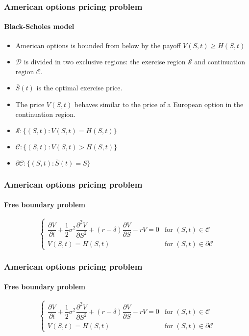\documentclass{beamer}
\begin{document}
\begin{frame}
    \frametitle{American options pricing problem}
    \framesubtitle{Black-Scholes model}
    \begin{itemize}
        \item American options is bounded from below by the payoff $V(S, t) \ge H(S, t)$
        \item $\mathcal{D}$ is divided in two exclusive regions: the exercise region $\mathcal{S}$ and continuation region $\mathcal{C}$. 
        \item $\bar{S}(t)$ is the optimal exercise price.
        \item The price $V(S, t)$ behaves similar to the price of a European option in the continuation region.
        \item $\mathcal{S}: \{(S,t): V(S, t) = H(S, t)\}$
        \item $\mathcal{C}: \{(S,t): V(S, t) > H(S, t)\}$
        \item $\partial{\mathcal{C}}: \{(S,t): \bar{S}(t) = S\}$
    \end{itemize}
\end{frame}

\begin{frame}
    \frametitle{American options pricing problem}
    \framesubtitle{Free boundary problem}

    \begin{equation}
        \begin{cases}
            \dfrac{\partial{V}}{\partial{t}} + \dfrac{1}{2}\sigma^2\dfrac{\partial^2{V}}{\partial{S^2}} + (r-\delta)\dfrac{\partial{V}}{\partial{S}} - rV = 0 & \text{for $(S, t) \in \mathcal{C}$} \\
            V(S, t) = H(S, t) & \text{for $(S, t) \in \partial{\mathcal{C}}$}
        \end{cases}
    \end{equation}
\end{frame}

\begin{frame}
    \frametitle{American options pricing problem}
    \framesubtitle{Free boundary problem}

    \begin{equation}
        \begin{cases}
            \dfrac{\partial{V}}{\partial{t}} + \dfrac{1}{2}\sigma^2\dfrac{\partial^2{V}}{\partial{S^2}} + (r-\delta)\dfrac{\partial{V}}{\partial{S}} - rV = 0 & \text{for $(S, t) \in \mathcal{C}$} \\
            V(S, t) = H(S, t) & \text{for $(S, t) \in \partial{\mathcal{C}}$}
        \end{cases}
    \end{equation}
\end{frame}
\end{document}

